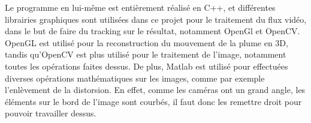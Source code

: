 
Le programme en lui-même est entièrement réalisé en C++, et différentes librairies graphiques sont utilisées dans ce projet pour le traitement du flux vidéo, dans le but de faire du tracking sur le résultat, notamment OpenGl et OpenCV. OpenGL est utilisé pour la reconstruction du mouvement de la plume en 3D, tandis qu'OpenCV est plus utilisé pour le traitement de l'image, notamment toutes les opérations faites dessus. De plus, Matlab est utilisé pour effectuées diverses opérations mathématiques sur les images, comme par exemple l'enlèvement de la distorsion. En effet, comme les caméras ont un grand angle, les éléments sur le bord de l'image sont courbés, il faut donc les remettre droit pour pouvoir travailler dessus.